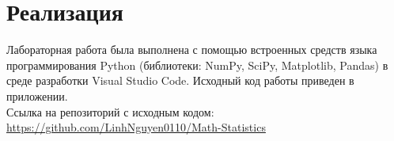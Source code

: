 \section{Реализация}

Лабораторная работа была выполнена с помощью встроенных средств языка программирования Python (библиотеки: NumPy, SciPy, Matplotlib, Pandas) в среде разработки Visual Studio Code. Исходный код работы приведен в приложении.\\

Ссылка на репозиторий с исходным кодом: \url{https://github.com/LinhNguyen0110/Math-Statistics}

